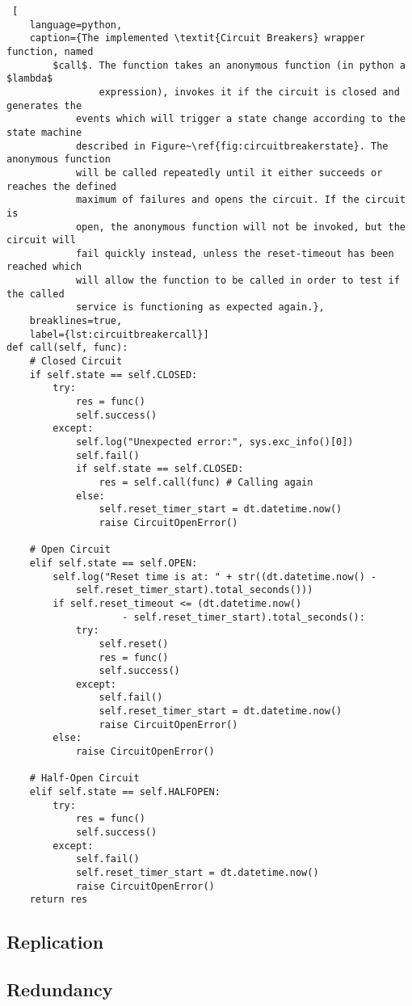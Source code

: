 \begin{lstlisting} [
	language=python,
	caption={The implemented \textit{Circuit Breakers} wrapper function, named
		$call$. The function takes an anonymous function (in python a $lambda$
				expression), invokes it if the circuit is closed and generates the
			events which will trigger a state change according to the state machine
			described in Figure~\ref{fig:circuitbreakerstate}. The anonymous function
			will be called repeatedly until it either succeeds or reaches the defined
			maximum of failures and opens the circuit. If the circuit is
			open, the anonymous function will not be invoked, but the circuit will
			fail quickly instead, unless the reset-timeout has been reached which
			will allow the function to be called in order to test if the called
			service is functioning as expected again.},
	breaklines=true,
	label={lst:circuitbreakercall}]
def call(self, func):
	# Closed Circuit
	if self.state == self.CLOSED:
		try:
			res = func()
			self.success()
		except:
			self.log("Unexpected error:", sys.exc_info()[0])
			self.fail()
			if self.state == self.CLOSED:
				res = self.call(func) # Calling again
			else:
				self.reset_timer_start = dt.datetime.now()
				raise CircuitOpenError()
							
	# Open Circuit
	elif self.state == self.OPEN:
		self.log("Reset time is at: " + str((dt.datetime.now() -
			self.reset_timer_start).total_seconds()))
		if self.reset_timeout <= (dt.datetime.now()
					- self.reset_timer_start).total_seconds():
			try:
				self.reset()
				res = func()
				self.success()
			except:
				self.fail()
				self.reset_timer_start = dt.datetime.now()
				raise CircuitOpenError()
		else:
			raise CircuitOpenError()

	# Half-Open Circuit
	elif self.state == self.HALFOPEN:
		try:
			res = func()
			self.success()
		except:
			self.fail()
			self.reset_timer_start = dt.datetime.now()
			raise CircuitOpenError()
	return res
\end{lstlisting}

\subsection{Replication}

\subsection{Redundancy}
